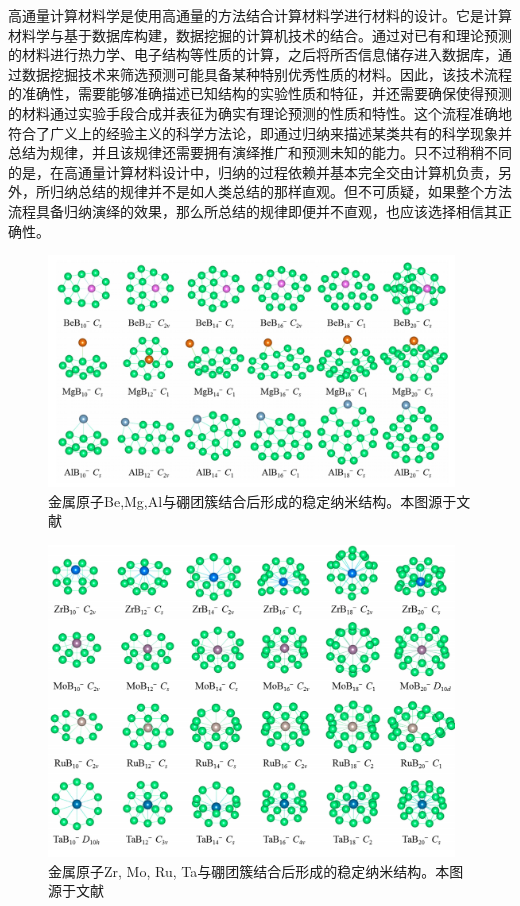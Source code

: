 高通量计算材料学是使用高通量的方法结合计算材料学进行材料的设计。它是计算材料学与基于数据库构建，数据挖掘的计算机技术的结合。通过对已有和理论预测的材料进行热力学、电子结构等性质的计算，之后将所否信息储存进入数据库，通过数据挖掘技术来筛选预测可能具备某种特别优秀性质的材料。因此，该技术流程的准确性，需要能够准确描述已知结构的实验性质和特征，并还需要确保使得预测的材料通过实验手段合成并表征为确实有理论预测的性质和特性。这个流程准确地符合了广义上的经验主义的科学方法论，即通过归纳来描述某类共有的科学现象并总结为规律，并且该规律还需要拥有演绎推广和预测未知的能力。只不过稍稍不同的是，在高通量计算材料设计中，归纳的过程依赖并基本完全交由计算机负责，另外，所归纳总结的规律并不是如人类总结的那样直观。但不可质疑，如果整个方法流程具备归纳演绎的效果，那么所总结的规律即便并不直观，也应该选择相信其正确性。

\begin{figure}
  \includegraphics[width=0.96\textwidth]{figs/ch1_boron_cluster01.png}
  \centering
  \caption{金属原子Be,Mg,Al与硼团簇结合后形成的稳定纳米结构。本图源于文献\cite{tian2019cluster}}
  \label{fig:ch1_boron_cluster01}
\end{figure}

\begin{figure}
  \includegraphics[width=0.96\textwidth]{figs/ch1_boron_cluster02.png}
  \centering
  \caption{金属原子Zr, Mo, Ru, Ta与硼团簇结合后形成的稳定纳米结构。本图源于文献\cite{tian2019cluster}}
  \label{fig:ch1_boron_cluster02}
\end{figure}

